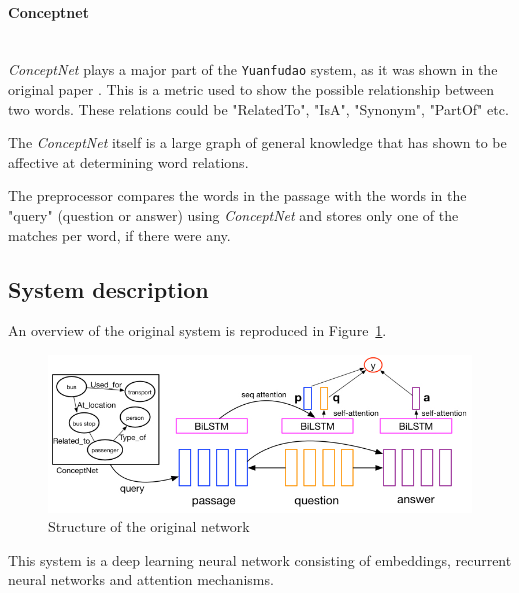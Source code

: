 \paragraph*{Conceptnet} \cite{Speer:2017} \\

\textit{ConceptNet} plays a major part of the \texttt{Yuanfudao} system, as it was shown in the original paper \cite{Wang:2018}. This is a metric  used to show the possible relationship between two words. These relations could be "RelatedTo", "IsA", "Synonym", "PartOf" etc. 

The \textit{ConceptNet} itself is a large graph of general knowledge that has shown to be affective at determining word relations.

The preprocessor compares the words in the passage with the words in the "query" (question or answer) using \textit{ConceptNet} and stores only one of the matches per word, if there were any.


\subsection{System description}

An overview of the original system is reproduced in Figure~\ref{fig:dnn}.
\begin{figure}[h!]
	\centering
	\includegraphics[scale=0.5]{figures/TriAN.jpg}
	\caption{Structure of the original network \cite{Wang:2018}}
	\label{fig:dnn}
\end{figure}

This system is a deep learning neural network consisting of embeddings, recurrent neural networks and attention mechanisms.

